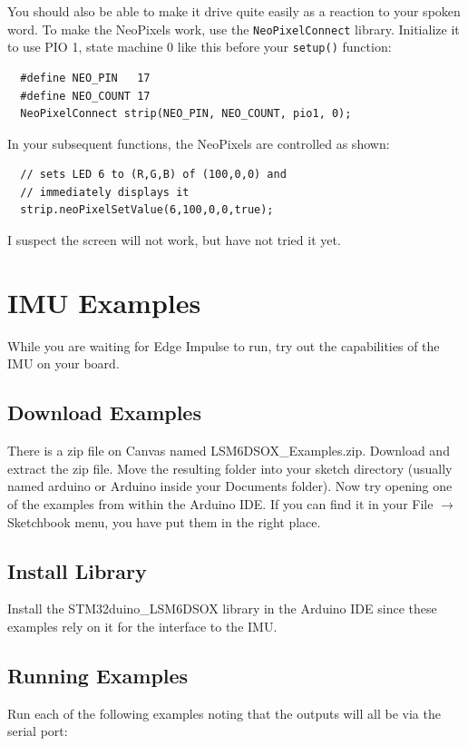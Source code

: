 You should also be able to make it drive quite easily as a reaction to your spoken word. To make 
the NeoPixels work, use the \lstinline|NeoPixelConnect| library. Initialize it to use PIO 1, 
state machine 0 like this before your \lstinline|setup()| function:
\begin{lstlisting}
  #define NEO_PIN   17
  #define NEO_COUNT 17
  NeoPixelConnect strip(NEO_PIN, NEO_COUNT, pio1, 0);
\end{lstlisting}

In your subsequent functions, the NeoPixels are controlled as shown:
\begin{lstlisting}
  // sets LED 6 to (R,G,B) of (100,0,0) and 
  // immediately displays it
  strip.neoPixelSetValue(6,100,0,0,true);
\end{lstlisting}

I suspect the screen will not work, but have not tried it yet.

\section{IMU Examples \label{sec:IMUMLexamples}}
While you are waiting for Edge Impulse to run, try out the 
capabilities of the IMU on your board. 

\subsection{Download Examples}
There is a zip file on Canvas named LSM6DSOX\_Examples.zip. Download and extract the zip 
file. Move the resulting folder into your sketch directory (usually named arduino or Arduino 
inside your Documents folder). Now try opening one of the examples from within the Arduino IDE.
If you can find it in your File $\rightarrow$ Sketchbook menu, you have put them in the right
place.

\subsection{Install Library}
Install the STM32duino\_LSM6DSOX library in the Arduino IDE since these examples rely on 
it for the interface to the IMU.

\subsection{Running Examples}
Run each of the following examples noting that the outputs will all be via the serial port:


